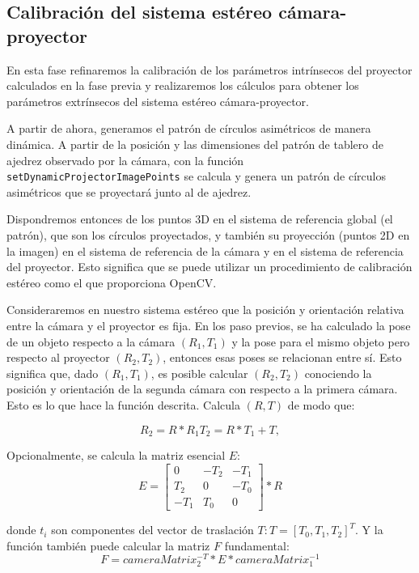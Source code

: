 \subsection{Calibración del sistema estéreo cámara-proyector}
En esta fase refinaremos la calibración de los parámetros intrínsecos del proyector calculados en la fase previa y realizaremos los cálculos para obtener los parámetros extrínsecos del sistema estéreo cámara-proyector.

A partir de ahora, generamos el patrón de círculos asimétricos de manera dinámica. A partir de la posición y las dimensiones del patrón de tablero de ajedrez observado por la cámara, con la función \texttt{setDynamicProjectorImagePoints} se calcula y genera un patrón de círculos asimétricos que se proyectará junto al de ajedrez. 

Dispondremos entonces de los puntos 3D en el sistema de referencia global (el patrón), que son los círculos proyectados, y también su proyección (puntos 2D en la imagen) en el sistema de referencia de la cámara y en el sistema de referencia del proyector. Esto significa que se puede utilizar  un procedimiento de calibración estéreo como el que proporciona OpenCV. 


Consideraremos en nuestro sistema estéreo que la posición y orientación relativa entre la cámara y el proyector es fija. En los paso previos, se ha  calculado la pose de un objeto respecto a la cámara $(R_1, T_1)$ y la pose para el mismo objeto pero respecto al proyector $(R_2, T_2)$, entonces esas poses se relacionan entre sí. Esto significa que, dado $(R_1,T_1)$, es posible calcular $(R_2,T_2)$ conociendo la posición y orientación de la segunda cámara con respecto a la primera cámara. Esto es lo que hace la función descrita. Calcula $(R,T)$ de modo que:

\begin{equation}
R_2 = R * R_1
T_2 = R * T_1 + T,
\end{equation}

Opcionalmente, se calcula la matriz esencial $E$:
\begin{equation}
E=\begin{bmatrix}
0 & -T_2 & -T_1\\ 
T_2 & 0  & -T_0\\ 
-T_1 & T_0 & 0 
\end{bmatrix} * R
\end{equation}

donde $t_i$ son componentes del vector de traslación $T: T = [T_0, T_1, T_2] ^ T$. Y la función también puede calcular la matriz $F$ fundamental:
\begin{equation}
F = cameraMatrix_2^ {-T} * E * cameraMatrix_1^{-1}
\end{equation}


